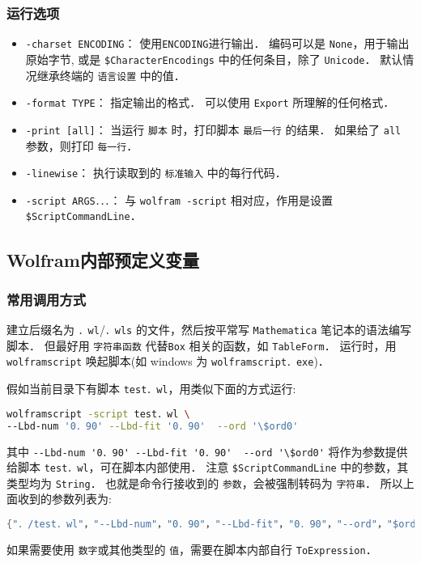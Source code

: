 \subsubsection{运行选项}
\begin{itemize}
\item \verb`-charset ENCODING`： 使用\verb`ENCODING`进行输出． 编码可以是 \verb`None`，用于输出原始字节,
或是 \verb`$CharacterEncodings` 中的任何条目，除了 \verb`Unicode`． 默认情况继承终端的 \verb`语言设置` 中的值．
\item \verb`-format TYPE`： 指定输出的格式． 可以使用 \verb`Export` 所理解的任何格式．
\item \verb`-print [all]`： 当运行 \verb`脚本` 时，打印脚本 \verb`最后一行` 的结果． 如果给了 \verb`all` 参数，则打印 \verb`每一行`．
\item \verb`-linewise`： 执行读取到的 \verb`标准输入` 中的每行代码．
\item \verb`-script ARGS．．．`： 与 \verb`wolfram -script` 相对应，作用是设置 \verb`$ScriptCommandLine`．
\end{itemize}

\subsection{Wolfram内部预定义变量}

\subsubsection{常用调用方式}

建立后缀名为 \verb`．wl`/\verb`．wls` 的文件，然后按平常写 \verb`Mathematica` 笔记本的语法编写脚本．
但最好用 \verb`字符串函数` 代替\verb`Box` 相关的函数，如 \verb`TableForm`．
运行时，用 \verb`wolframscript` 唤起脚本(如 windows 为 \verb`wolframscript．exe`)．

假如当前目录下有脚本 \verb`test．wl`，用类似下面的方式运行:
\begin{lstlisting}[language=bash]
wolframscript -script test．wl \
--Lbd-num '0．90' --Lbd-fit '0．90'  --ord '\$ord0'
\end{lstlisting}

其中 \verb`--Lbd-num '0．90' --Lbd-fit '0．90'  --ord '\$ord0'` 将作为参数提供给脚本 \verb`test．wl`，可在脚本内部使用．
注意 \verb`$ScriptCommandLine` 中的参数，其类型均为 \verb`String`．
也就是命令行接收到的 \verb`参数`，会被强制转码为 \verb`字符串`．
所以上面收到的参数列表为:
\begin{lstlisting}[language=Mathematica]
{"．/test．wl"，"--Lbd-num"，"0．90"，"--Lbd-fit"，"0．90"，"--ord"，"$ord0"}
\end{lstlisting}
如果需要使用 \verb`数字`或其他类型的 \verb`值`，需要在脚本内部自行 \verb`ToExpression`．

